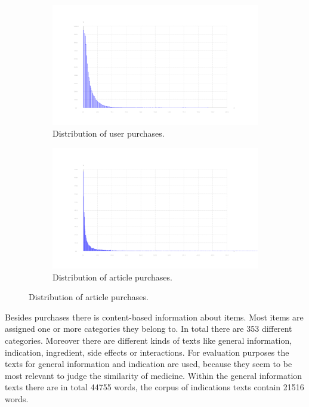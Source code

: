 \documentclass[10pt]{reportMaster}
\begin{document}
\begin{figure}
	\label{fig:dataDistribution}
	\begin{subfigure}[c]{1\textwidth}
		\caption{Distribution of user purchases.}
		\centering
		\includegraphics[width=1\textwidth]{figures/experiments/userPurchaseHistogram}
	\end{subfigure}
	\begin{subfigure}[c]{1\textwidth}
		\caption{Distribution of article purchases.}
		\centering
		\includegraphics[width=1\textwidth]{figures/experiments/articlePurchaseHistogram_partly}
	\end{subfigure}
\end{figure}

Besides purchases there is content-based information about items.
Most items are assigned one or more categories they belong to.
In total there are 353 different categories.
Moreover there are different kinds of texts like general information, indication, ingredient, side effects or interactions.
For evaluation purposes the texts for general information and indication are used, because they seem to be most relevant to judge the similarity of medicine.
Within the general information texts there are in total 44755 words, the corpus of indications texts contain 21516 words. %
\end{document}
